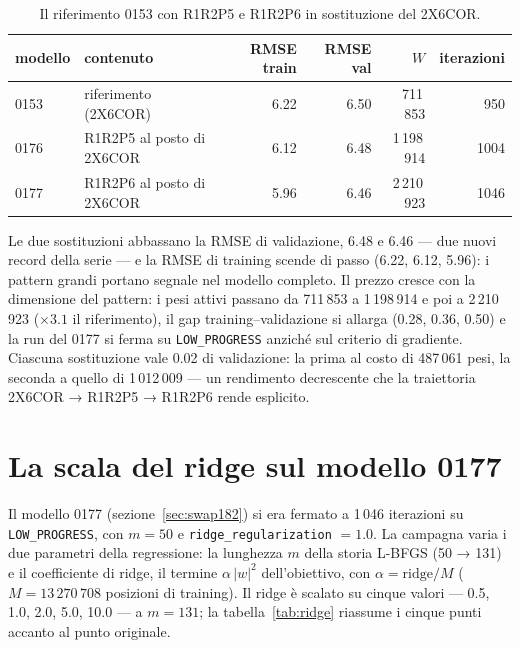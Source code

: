 \begin{table}[ht]
\centering
\small
\begin{tabular}{llrrrr}
\toprule
modello & contenuto & RMSE train & RMSE val & $W$ & iterazioni \\
\midrule
0153 & riferimento (2X6COR) & 6.22 & 6.50 & 711\,853 & 950 \\
0176 & R1R2P5 al posto di 2X6COR & 6.12 & 6.48 & 1\,198\,914 & 1004 \\
0177 & R1R2P6 al posto di 2X6COR & 5.96 & 6.46 & 2\,210\,923 & 1046 \\
\bottomrule
\end{tabular}
\caption{Il riferimento 0153 con R1R2P5 e R1R2P6 in sostituzione del
2X6COR.}
\label{tab:r1r2swap}
\end{table}

Le due sostituzioni abbassano la RMSE di validazione, 6.48 e
6.46 — due nuovi record della serie — e la RMSE di training
scende di passo (6.22, 6.12, 5.96): i pattern grandi portano
segnale nel modello completo. Il prezzo cresce con la
dimensione del pattern: i pesi attivi passano da 711\,853 a
1\,198\,914 e poi a 2\,210\,923 ($\times 3.1$ il riferimento), il
gap training--validazione si allarga (0.28, 0.36, 0.50) e la
run del 0177 si ferma su \texttt{LOW\_PROGRESS} anziché sul
criterio di gradiente. Ciascuna sostituzione vale 0.02 di
validazione: la prima al costo di 487\,061 pesi, la seconda a
quello di 1\,012\,009 — un rendimento decrescente che la
traiettoria 2X6COR → R1R2P5 → R1R2P6 rende esplicito.

\section{La scala del ridge sul modello 0177}

Il modello 0177 (sezione~\ref{sec:swap182}) si era fermato a
1\,046 iterazioni su \texttt{LOW\_PROGRESS}, con $m = 50$ e
\texttt{ridge\_regularization} $= 1.0$. La campagna varia i due
parametri della regressione: la lunghezza $m$ della storia
L-BFGS (50 → 131) e il coefficiente di ridge, il termine
$\alpha\,\left\lvert w\right\rvert^2$ dell'obiettivo, con $\alpha = \text{ridge}/M$
($M = 13\,270\,708$ posizioni di training). Il ridge è scalato su
cinque valori — 0.5, 1.0, 2.0, 5.0, 10.0 — a $m = 131$; la
tabella~\ref{tab:ridge} riassume i cinque punti accanto al punto
originale.

